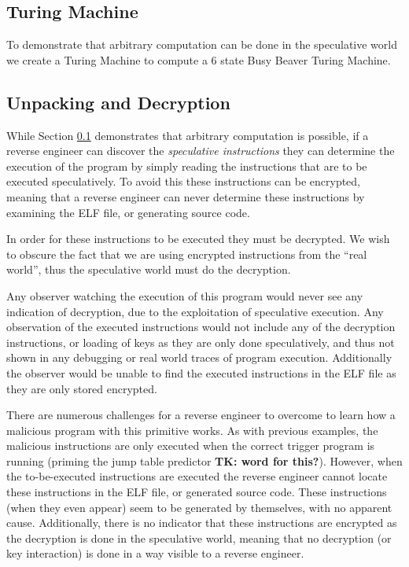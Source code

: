 \subsection{Turing Machine}
\label{subsec:turing}
To demonstrate that arbitrary computation can be done in the speculative world
we create a Turing Machine to compute a 6 state Busy Beaver Turing Machine. 

\subsection{Unpacking and Decryption}
\label{subsec:decryption}
While Section \ref{subsec:turing} demonstrates that arbitrary computation is
possible, if a reverse engineer can discover the \emph{speculative instructions}
they can determine the execution of the program by simply reading the
instructions that are to be executed speculatively. To avoid this these
instructions can be encrypted, meaning that a reverse engineer can never
determine these instructions by examining the ELF file, or generating source
code. 

In order for these instructions to be executed they must be decrypted. We wish
to obscure the fact that we are using encrypted instructions from the ``real
world'', thus  the speculative world must do the decryption. 

Any observer watching the execution of this program would never see any
indication of decryption, due to the exploitation of speculative execution. Any
observation of the executed instructions would not include any of the decryption
instructions, or loading of keys as they are only done speculatively, and thus
not shown in any debugging or real world traces of program execution.
Additionally the observer would be unable to find the executed instructions in
the ELF file as they are only stored encrypted. 

There are numerous challenges for a reverse engineer to overcome to learn how a
malicious program with this primitive works. As with previous examples, the
malicious instructions are only executed when the correct trigger program is
running (priming the jump table predictor \textbf{TK: word for this?}). However,
when the to-be-executed instructions are executed the reverse engineer cannot
locate these instructions in the ELF file, or generated source code. These
instructions (when they even appear) seem to be generated by themselves, with no
apparent cause. Additionally, there is no indicator that these instructions are
encrypted as the decryption is done in the speculative world, meaning that no
decryption (or key interaction) is done in a way visible to a reverse engineer.

